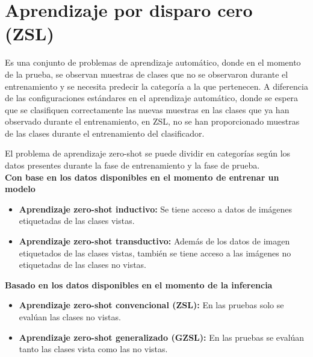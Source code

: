 \section {Aprendizaje por disparo cero (ZSL)}
Es una conjunto de problemas de aprendizaje automático, donde en el momento de la prueba, se observan muestras de clases que no se observaron durante el entrenamiento y se necesita predecir la categoría a la que pertenecen. A diferencia de las configuraciones estándares en el aprendizaje automático, donde se espera que se clasifiquen correctamente las nuevas muestras en las clases que ya han observado durante el entrenamiento, en ZSL, no se han proporcionado muestras de las clases durante el entrenamiento del clasificador.

El problema de aprendizaje zero-shot se puede dividir en categorías según los datos presentes durante la fase de entrenamiento y la fase de prueba.\\
\textbf{Con base en los datos disponibles en el momento de entrenar un modelo}
\begin{itemize}
	\item \textbf{Aprendizaje zero-shot inductivo:} Se tiene acceso a datos de imágenes etiquetadas de las clases vistas.
	\item \textbf{Aprendizaje zero-shot transductivo:} Además de los datos de imagen etiquetados de las clases vistas, también se tiene acceso a las imágenes no etiquetadas de las clases no vistas.
\end{itemize}
\textbf{Basado en los datos disponibles en el momento de la inferencia}
\begin{itemize}
	\item \textbf{Aprendizaje zero-shot convencional (ZSL):} En las pruebas solo se evalúan las clases no vistas.
	\item \textbf{Aprendizaje zero-shot generalizado (GZSL):} En las pruebas se evalúan tanto las clases vista como las no vistas.
\end{itemize}

